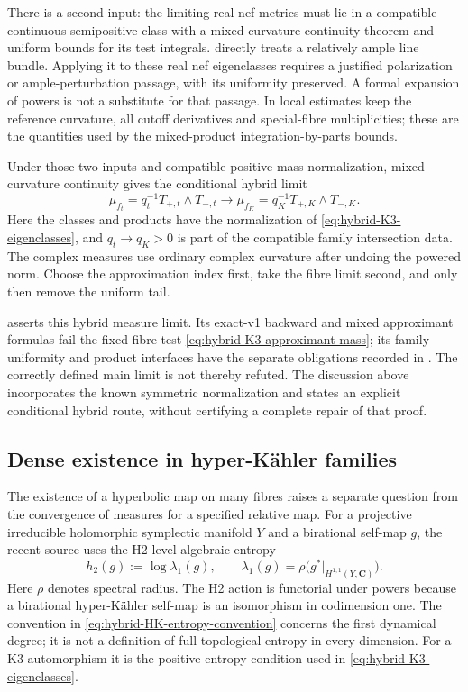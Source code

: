 There is a second input: the limiting real nef metrics must lie in
a compatible continuous semipositive class with a mixed-curvature
continuity theorem and uniform bounds for its test integrals.
 directly treats a relatively ample
line bundle. Applying it to these real nef eigenclasses requires a
justified polarization or ample-perturbation passage, with its
uniformity preserved. A formal expansion of powers is not a substitute
for that passage. In local estimates keep the reference curvature,
all cutoff derivatives and special-fibre multiplicities; these are
the quantities used by the mixed-product integration-by-parts bounds.

Under those two inputs and compatible positive mass normalization,
mixed-curvature continuity gives the conditional hybrid limit
\[
 \mu_{f_t}=q_t^{-1}T_{+,t}\wedge T_{-,t}
                 \longrightarrow
 \mu_{f_K}=q_K^{-1}T_{+,K}\wedge T_{-,K}.
\tag{66.29aa}\label{eq:hybrid-K3-conditional-limit}
\]
Here the classes and products have the normalization of
\eqref{eq:hybrid-K3-eigenclasses}, and $q_t\to q_K>0$ is part of
the compatible family intersection data. The complex measures use
ordinary complex curvature after undoing the powered norm.
Choose the approximation index first, take the fibre limit second,
and only then remove the uniform tail.

\cite[Theorem~1.1]{Irokawa24K3V1} asserts this hybrid measure limit.
Its exact-v1 backward and mixed approximant formulas fail the
fixed-fibre test \eqref{eq:hybrid-K3-approximant-mass}; its family
uniformity and product interfaces have the separate obligations
recorded in . The correctly defined main
limit is not thereby refuted. The discussion above incorporates
the known symmetric normalization and states an explicit conditional
hybrid route, without certifying a complete repair of that proof.

\subsection{Dense existence in hyper-K\"ahler families}
\label{sec:hybrid-HK-dense-entropy}

The existence of a hyperbolic map on many fibres raises a separate
question from the convergence of measures for a specified relative map.
For a projective irreducible holomorphic symplectic manifold $Y$
and a birational self-map $g$, the recent source
\cite{DenisiEtAl26EntropyV1} uses the H2-level algebraic entropy
\[
 h_2(g):=\log\lambda_1(g),\qquad
 \lambda_1(g)=
 \rho\bigl(g^*|_{H^{1,1}(Y,\mathbf C)}\bigr).
\tag{66.29ab}\label{eq:hybrid-HK-entropy-convention}
\]
Here $\rho$ denotes spectral radius. The H2 action is functorial
under powers because a birational hyper-K\"ahler self-map is an
isomorphism in codimension one. The convention in
\eqref{eq:hybrid-HK-entropy-convention} concerns the first dynamical
degree; it is not a definition of full topological entropy in every
dimension. For a K3 automorphism it is the positive-entropy condition
used in \eqref{eq:hybrid-K3-eigenclasses}.

